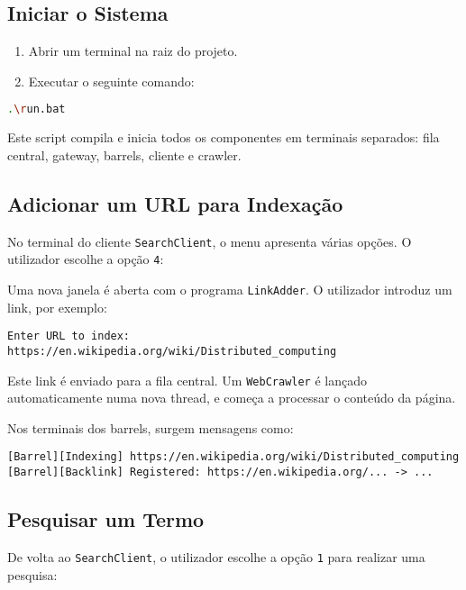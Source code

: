 \documentclass{article}
\begin{document}
\subsection{Iniciar o Sistema}

\begin{enumerate}
    \item Abrir um terminal na raiz do projeto.
    \item Executar o seguinte comando:
\end{enumerate}

\begin{lstlisting}[language=bash]
.\run.bat
\end{lstlisting}

Este script compila e inicia todos os componentes em terminais separados: fila central, gateway, barrels, cliente e crawler.

\subsection{Adicionar um URL para Indexação}

No terminal do cliente \texttt{SearchClient}, o menu apresenta várias opções. O utilizador escolhe a opção \texttt{4}:

Uma nova janela é aberta com o programa \texttt{LinkAdder}. O utilizador introduz um link, por exemplo:

\begin{lstlisting}
Enter URL to index: https://en.wikipedia.org/wiki/Distributed_computing
\end{lstlisting}

Este link é enviado para a fila central. Um \texttt{WebCrawler} é lançado automaticamente numa nova thread, e começa a processar o conteúdo da página.

Nos terminais dos barrels, surgem mensagens como:

\begin{lstlisting}
[Barrel][Indexing] https://en.wikipedia.org/wiki/Distributed_computing
[Barrel][Backlink] Registered: https://en.wikipedia.org/... -> ...
\end{lstlisting}

\subsection{Pesquisar um Termo}

De volta ao \texttt{SearchClient}, o utilizador escolhe a opção \texttt{1} para realizar uma pesquisa:
\end{document}
